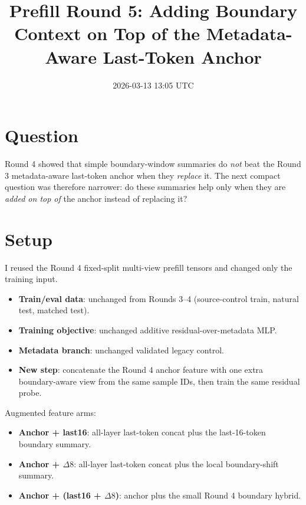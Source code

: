 \documentclass[11pt]{article}
\title{Prefill Round 5: Adding Boundary Context on Top of the Metadata-Aware Last-Token Anchor}
\author{}
\date{2026-03-13 13:05 UTC}
\begin{document}
\maketitle

\section*{Question}
Round 4 showed that simple boundary-window summaries do \emph{not} beat the Round 3 metadata-aware last-token anchor when they \emph{replace} it. The next compact question was therefore narrower: do these summaries help only when they are \emph{added on top of} the anchor instead of replacing it?

\section*{Setup}
I reused the Round 4 fixed-split multi-view prefill tensors and changed only the training input.

\begin{itemize}
  \item \textbf{Train/eval data}: unchanged from Rounds 3--4 (source-control train, natural test, matched test).
  \item \textbf{Training objective}: unchanged additive residual-over-metadata MLP.
  \item \textbf{Metadata branch}: unchanged validated legacy control.
  \item \textbf{New step}: concatenate the Round 4 anchor feature with one extra boundary-aware view from the same sample IDs, then train the same residual probe.
\end{itemize}

Augmented feature arms:
\begin{itemize}
  \item \textbf{Anchor + last16}: all-layer last-token concat plus the last-16-token boundary summary.
  \item \textbf{Anchor + $\Delta8$}: all-layer last-token concat plus the local boundary-shift summary.
  \item \textbf{Anchor + (last16 + $\Delta8$)}: anchor plus the small Round 4 boundary hybrid.
\end{itemize}
\end{document}
